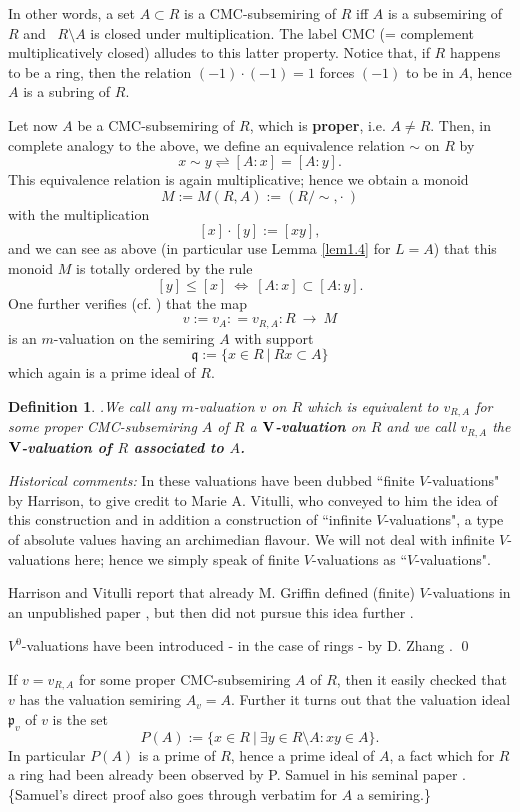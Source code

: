 \documentclass [12pt,a4paper,reqno]{amsart}
\newtheorem{defn}[thm]{Definition}
\begin{document}
In other words, a set $A \subset R$ is a CMC-subsemiring of $R$
iff $A$ is a subsemiring of $R$ and~ $R \setminus A$ is closed
under multiplication. The label CMC (= complement multiplicatively
closed) alludes to this latter property. Notice that, if $R$
happens to be a ring, then the relation $(-1) \cdot (-1) = 1$
forces $(-1)$ to be in $A$, hence $A$ is a subring of $R$.

Let now $A$ be a CMC-subsemiring of $R$, which is \textbf{proper},
i.e. $A \neq R$. Then, in complete analogy to the above, we define
an equivalence relation $\sim$ on $R$ by
$$ x \sim y \rightleftharpoons [A:x] = [A:y].$$
This equivalence relation is again multiplicative; hence we obtain
a monoid
$$ M := M(R,A) := (R/\sim, \cdot \ )$$
with the multiplication
$$ [x] \cdot [y] := [xy],$$
and we can see as above (in particular use Lemma \ref{lem1.4} for
$L =A$) that this monoid $M$ is totally ordered by the rule
$$ [y] \leq [x] \ \Leftrightarrow \ [A:x] \subset [A:y]. $$
One further verifies (cf. \cite{HV1}) that the map
$$
v:= v_{ A}: =v_{R,A}:R {\ {\to} \ } M $$ is an $m$-valuation on the
semiring $A$ with support
$${\mathfrak q} := \{ x\in R {\ {|} \ } Rx \subset A\} $$
which  again is a prime ideal of $R$.

\begin{defn}\label{defn1.17} \cite{HV1}.We call any $m$-valuation
$v$ on $R$ which is equivalent to $v_{R,A} $  for some proper
CMC-subsemiring $A$ of $R$ a \textbf{$\bf V$-valuation} on $R$
and we call $v_{R,A} $ the \textbf{$\bf V$-valuation of $R$
associated to $A$.}
\end{defn}

  \emph{Historical comments:} In \cite{HV1}
these valuations have been dubbed ``finite $V$-valuations" by
Harrison, to give credit to Marie A. Vitulli, who conveyed to him
the idea of this construction and in addition a construction of
``infinite $V$-valuations", a type of absolute values having an
archimedian flavour. We will not deal with infinite $V$-valuations
here; hence we simply speak of finite $V$-valuations as
``$V$-valuations".

Harrison and Vitulli report that already M. Griffin defined
(finite) $V$-valuations in an unpublished paper \cite{Gr}, but
then did not pursue this idea further \cite[p.~269]{HV1}.

${V^0}$-valuations have been introduced - in the case of rings -  by
D. Zhang \cite{Z}. \hfill\quad \qed

{\vskip 1.5mm \noindent}

 If $v = v_{R,A}$ for some proper CMC-subsemiring $A$ of
$R$, then it easily checked  that $v$ has the valuation semiring
$A_v = A$. Further it turns out that the valuation ideal ${\mathfrak p}_v$
of $v$ is the set  \begin{equation}\label{eq:1.3-0} P(A) := \{
x\in R {\ {|} \ } \exists y \in R \setminus A : xy \in A \}.
\end{equation}
In particular $P(A)$ is a prime of $R$, hence a prime ideal of
$A$, a fact which for $R$ a ring had been already been observed by
P. Samuel in his seminal paper \cite{S}. \{Samuel's direct proof
also  goes through verbatim  for $A$ a semiring.\}
\end{document}

